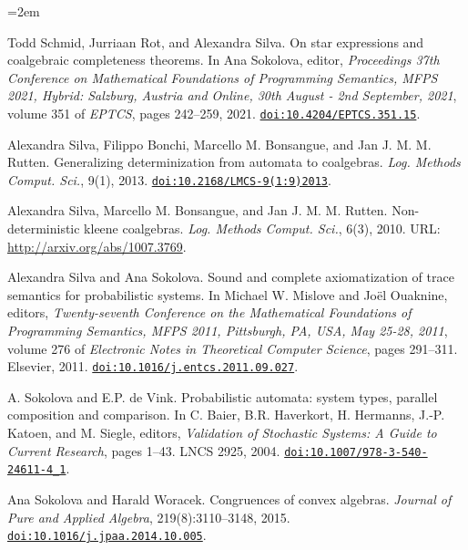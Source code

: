 \begin{list}{}{\leftmargin=2em}
\hypertarget{html:bib.bib22}{}
\item[]  [22]  Todd Schmid, Jurriaan Rot, and Alexandra Silva.  On star expressions and coalgebraic completeness theorems.  In Ana Sokolova, editor, \emph{Proceedings 37th Conference on Mathematical Foundations of Programming Semantics, MFPS 2021, Hybrid: Salzburg, Austria and Online, 30th August - 2nd September, 2021}, volume 351 of \emph{EPTCS}, pages 242–259, 2021.  \href{https://doi.org/10.4204/EPTCS.351.15}{\nolinkurl{doi:10.4204/EPTCS.351.15}}.  
\hypertarget{html:bib.bib23}{}
\item[]  [23]  Alexandra Silva, Filippo Bonchi, Marcello M. Bonsangue, and Jan J. M. M. Rutten.  Generalizing determinization from automata to coalgebras.  \emph{Log. Methods Comput. Sci.}, 9(1), 2013.  \href{https://doi.org/10.2168/LMCS-9(1:9)2013}{\nolinkurl{doi:10.2168/LMCS-9(1:9)2013}}.  
\hypertarget{html:bib.bib24}{}
\item[]  [24]  Alexandra Silva, Marcello M. Bonsangue, and Jan J. M. M. Rutten.  Non-deterministic kleene coalgebras.  \emph{Log. Methods Comput. Sci.}, 6(3), 2010.  URL: \href{http://arxiv.org/abs/1007.3769}{http://arxiv.org/abs/1007.3769}.  
\hypertarget{html:bib.bib25}{}
\item[]  [25]  Alexandra Silva and Ana Sokolova.  Sound and complete axiomatization of trace semantics for probabilistic systems.  In Michael W. Mislove and Joël Ouaknine, editors, \emph{Twenty-seventh Conference on the Mathematical Foundations of Programming Semantics, MFPS 2011, Pittsburgh, PA, USA, May 25-28, 2011}, volume 276 of \emph{Electronic Notes in Theoretical Computer Science}, pages 291–311. Elsevier, 2011.  \href{https://doi.org/10.1016/j.entcs.2011.09.027}{\nolinkurl{doi:10.1016/j.entcs.2011.09.027}}.  
\hypertarget{html:bib.bib26}{}
\item[]  [26]  A. Sokolova and E.P. de Vink.  Probabilistic automata: system types, parallel composition and comparison.  In C. Baier, B.R. Haverkort, H. Hermanns, J.-P. Katoen, and M. Siegle, editors, \emph{Validation of Stochastic Systems: A Guide to Current Research}, pages 1–43. LNCS 2925, 2004.  \href{https://doi.org/10.1007/978-3-540-24611-4_1}{\nolinkurl{doi:10.1007/978-3-540-24611-4_1}}.  
\hypertarget{html:bib.bib27}{}
\item[]  [27]  Ana Sokolova and Harald Woracek.  Congruences of convex algebras.  \emph{Journal of Pure and Applied Algebra}, 219(8):3110–3148, 2015.  \href{https://doi.org/10.1016/j.jpaa.2014.10.005}{\nolinkurl{doi:10.1016/j.jpaa.2014.10.005}}.  

\end{list}
